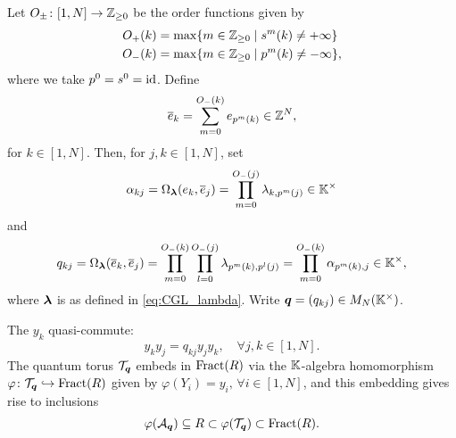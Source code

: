 Let $O_{\pm} \colon [1, N] \to \mathbb{Z}_{\geq 0}$ be the order
functions given by
\begin{align*}
	O_{+}(k) & = \max\{m \in \mathbb{Z}_{\geq 0} \mid s^m(k) \neq + \infty\}   \\
	O_{-}(k) & = \max\{m \in \mathbb{Z}_{\geq 0} \mid p^m(k) \neq - \infty\} ,
\end{align*}
%
where we take $p^0 = s^0 = \operatorname{id}$. Define
\begin{equation*}
	\overline{e}_k = \sum_{m=0}^{O_{-}(k)} e_{p^m(k)} \in \mathbb{Z}^N,
\end{equation*}
%
for $k \in [1, N]$. Then, for $j,k \in [1, N]$, set
\begin{equation*}
	\alpha_{kj} = \Omega_{\boldsymbol{\lambda}}(e_k, \overline{e}_j) = \prod_{m=0}^{O_{-}(j)}\lambda_{k, p^m(j)} \in \mathbb{K}^\times
\end{equation*}
and
\begin{equation*}
	q_{kj} = \Omega_{\boldsymbol{\lambda}}(\overline{e}_k, \overline{e}_j) = \prod_{m=0}^{O_{-}(k)}\prod_{l=0}^{O_{-}(j)}\lambda_{p^m(k),p^l(j)} = \prod_{m=0}^{O_{-}(k)}\alpha_{p^m (k),j} \in \mathbb{K}^\times,
\end{equation*}
%
where $\boldsymbol{\lambda}$ is as defined in \cref{eq:CGL_lambda}. Write $\boldsymbol{q} = (q_{kj}) \in
	M_N(\mathbb{K}^\times)$.
\begin{proposition}
	The $y_k$ quasi-commute:
	\begin{equation}\label{eq:y_quasi_commute}
		y_k y_j = q_{kj}y_jy_k, \quad \forall j, k \in [1, N].
	\end{equation}
	The quantum torus $\mathcal{T}_{\boldsymbol{q}}$ embeds in $\operatorname{Fract}(R)$ via the $\mathbb{K}$-algebra
	homomorphism $\varphi \colon \mathcal{T}_{\boldsymbol{q}} \hookrightarrow \operatorname{Fract}(R)$ given by $\varphi(Y_i) =
		y_i,\,\forall i \in [1, N]$, and this embedding gives rise to inclusions
	\begin{equation*}
		\varphi(\mathcal{A}_{\boldsymbol{q}}) \subseteq R \subset \varphi(\mathcal{T}_{\boldsymbol{q}}) \subset \operatorname{Fract}(R).
	\end{equation*}
\end{proposition}

